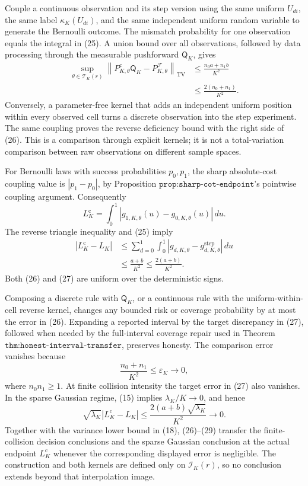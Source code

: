 Couple a continuous observation and its step version using the same
uniform \(U_{di}\), the same label \(\kappa_K(U_{di})\), and the same
independent uniform random variable to generate the Bernoulli outcome.
The mismatch probability for one observation equals the integral in
(25).  A union bound over all observations, followed by data processing
through the measurable pushforward \(\mathsf Q_K\), gives
\[
\begin{aligned}
 \sup_{\theta\in\mathcal T_K(r)}
 \left\|P^{\mathrm c}_{K,\theta}\mathsf Q_K
       -P^{\mathcal F}_{K,\theta}\right\|_{\mathrm{TV}}
 &\le\frac{n_0a+n_1b}{K^2}\\
 &\le\frac{2(n_0+n_1)}{K^2}.
\end{aligned}
\tag{26}
\]
Conversely, a parameter-free kernel that adds an independent uniform
position within every observed cell turns a discrete observation into
the step experiment.  The same coupling proves the reverse deficiency
bound with the right side of (26).  This is a comparison through
explicit kernels; it is not a total-variation comparison between raw
observations on different sample spaces.

For Bernoulli laws with success probabilities \(p_0,p_1\), the sharp
absolute-cost coupling value is \(|p_1-p_0|\), by Proposition
\(\texttt{prop:sharp-cot-endpoint}\)'s pointwise coupling argument.
Consequently
\[
 L_K^{\mathrm c}
 =\int_0^1|g_{1,K,\theta}(u)-g_{0,K,\theta}(u)|\,du.
\]
The reverse triangle inequality and (25) imply
\[
\begin{aligned}
 |L_K^{\mathrm c}-L_K|
 &\le
 \sum_{d=0}^1\int_0^1
 |g_{d,K,\theta}-g^{\mathrm{step}}_{d,K,\theta}|\,du\\
 &\le\frac{a+b}{K^2}
 \le\frac{2(a+b)}{K^2}.
\end{aligned}
\tag{27}
\]
Both (26) and (27) are uniform over the deterministic signs.

Composing a discrete rule with \(\mathsf Q_K\), or a continuous rule
with the uniform-within-cell reverse kernel, changes any bounded risk or
coverage probability by at most the error in (26).  Expanding a
reported interval by the target discrepancy in (27), followed when
needed by the full-interval coverage repair used in Theorem
\(\texttt{thm:honest-interval-transfer}\), preserves honesty.  The
comparison error vanishes because
\[
 \frac{n_0+n_1}{K^2}
 \le\varepsilon_K
 \longrightarrow0,
 \tag{28}
\]
where \(n_0n_1\ge1\).  At finite collision intensity the target error in
(27) also vanishes.  In the sparse Gaussian regime, (15) implies
\(\lambda_K/K\to0\), and hence
\[
 \sqrt{\lambda_K}|L_K^{\mathrm c}-L_K|
 \le\frac{2(a+b)\sqrt{\lambda_K}}{K^2}
 \longrightarrow0.
 \tag{29}
\]
Together with the variance lower bound in (18), (26)--(29) transfer the
finite-collision decision conclusions and the sparse Gaussian
conclusion at the actual endpoint \(L_K^{\mathrm c}\) whenever the
corresponding displayed error is negligible.  The construction and both
kernels are defined only on \(\mathcal I_K(r)\), so no conclusion
extends beyond that interpolation image.

